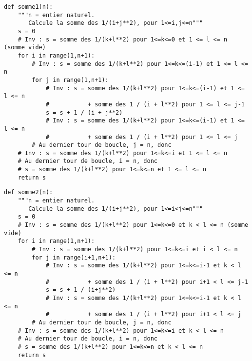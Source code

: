 \question{}
\begin{lstlisting}
def somme1(n):
    """n = entier naturel.
       Calcule la somme des 1/(i+j**2), pour 1<=i,j<=n"""
    s = 0
    # Inv : s = somme des 1/(k+l**2) pour 1<=k<=0 et 1 <= l <= n (somme vide)
    for i in range(1,n+1):
        # Inv : s = somme des 1/(k+l**2) pour 1<=k<=(i-1) et 1 <= l <= n 
        for j in range(1,n+1):
            # Inv : s = somme des 1/(k+l**2) pour 1<=k<=(i-1) et 1 <= l <= n 
            #           + somme des 1 / (i + l**2) pour 1 <= l <= j-1
            s = s + 1 / (i + j**2)
            # Inv : s = somme des 1/(k+l**2) pour 1<=k<=(i-1) et 1 <= l <= n 
            #           + somme des 1 / (i + l**2) pour 1 <= l <= j
        # Au dernier tour de boucle, j = n, donc 
	# Inv : s = somme des 1/(k+l**2) pour 1<=k<=i et 1 <= l <= n
    # Au dernier tour de boucle, i = n, donc 
    # s = somme des 1/(k+l**2) pour 1<=k<=n et 1 <= l <= n 
    return s
\end{lstlisting}

\begin{lstlisting}
def somme2(n):
    """n = entier naturel.
       Calcule la somme des 1/(i+j**2), pour 1<=i<j<=n"""
    s = 0
    # Inv : s = somme des 1/(k+l**2) pour 1<=k<=0 et k < l <= n (somme vide)
    for i in range(1,n+1):
        # Inv : s = somme des 1/(k+l**2) pour 1<=k<=i et i < l <= n 
        for j in range(i+1,n+1):
            # Inv : s = somme des 1/(k+l**2) pour 1<=k<=i-1 et k < l <= n 
            #           + somme des 1 / (i + l**2) pour i+1 < l <= j-1 
            s = s + 1 / (i+j**2)
            # Inv : s = somme des 1/(k+l**2) pour 1<=k<=i-1 et k < l <= n 
            #           + somme des 1 / (i + l**2) pour i+1 < l <= j 
        # Au dernier tour de boucle, j = n, donc 
	# Inv : s = somme des 1/(k+l**2) pour 1<=k<=i et k < l <= n
    # Au dernier tour de boucle, i = n, donc 
    # s = somme des 1/(k+l**2) pour 1<=k<=n et k < l <= n 
    return s
\end{lstlisting}